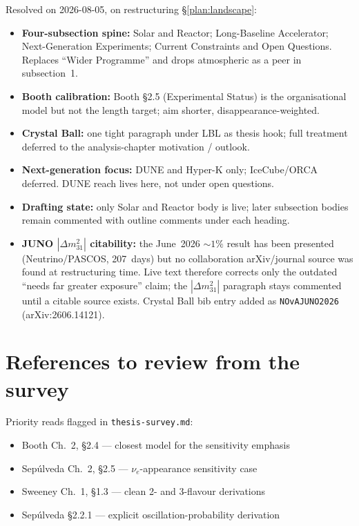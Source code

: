 \documentclass[11pt]{article}
\begin{document}
Resolved on 2026-08-05, on restructuring \S\ref{plan:landscape}:
\begin{itemize}
    \item[$\checkmark$] \textbf{Four-subsection spine:} Solar and Reactor; Long-Baseline
    Accelerator; Next-Generation Experiments; Current Constraints and Open Questions.
    Replaces ``Wider Programme'' and drops atmospheric as a peer in subsection~1.
    \item[$\checkmark$] \textbf{Booth calibration:} Booth \S2.5 (Experimental Status) is the
    organisational model but not the length target; aim shorter, disappearance-weighted.
    \item[$\checkmark$] \textbf{Crystal Ball:} one tight paragraph under LBL as thesis hook;
    full treatment deferred to the analysis-chapter motivation / outlook.
    \item[$\checkmark$] \textbf{Next-generation focus:} DUNE and Hyper-K only; IceCube/ORCA
    deferred. DUNE reach lives here, not under open questions.
    \item[$\checkmark$] \textbf{Drafting state:} only Solar and Reactor body is live; later
    subsection bodies remain commented with outline comments under each heading.
    \item[$\checkmark$] \textbf{JUNO $|\Delta m^{2}_{31}|$ citability:} the June~2026
    $\sim 1\%$ result has been presented (Neutrino/PASCOS, 207~days) but no
    collaboration arXiv/journal source was found at restructuring time. Live text therefore
    corrects only the outdated ``needs far greater exposure'' claim; the $|\Delta m^{2}_{31}|$
    paragraph stays commented until a citable source exists. Crystal Ball bib entry added as
    \texttt{NOvAJUNO2026} (arXiv:2606.14121).
\end{itemize}


\section{References to review from the survey}

Priority reads flagged in \texttt{thesis-survey.md}:
\begin{itemize}
    \item Booth Ch.~2, \S2.4 --- closest model for the sensitivity emphasis
    \item Sep\'ulveda Ch.~2, \S2.5 --- $\nu_{e}$-appearance sensitivity case
    \item Sweeney Ch.~1, \S1.3 --- clean 2- and 3-flavour derivations
    \item Sep\'ulveda \S2.2.1 --- explicit oscillation-probability derivation
\end{itemize}
\end{document}
